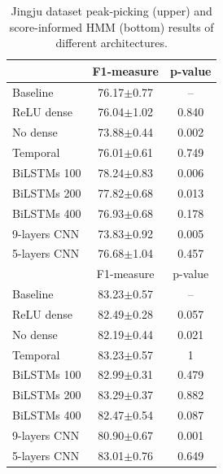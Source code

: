 \begin{table}[ht!]
\centering
\caption{Jingju dataset peak-picking (upper) and score-informed HMM (bottom) results of different architectures.}
\label{table:peak_picking_jingju_archi}
\begin{tabular}{l|cc}
\toprule
               & F1-measure & p-value \\
\midrule
Baseline     &76.17$\pm$0.77     & -- \\
ReLU dense     &76.04$\pm$1.02       & 0.840              \\
No dense       &73.88$\pm$0.44       & 0.002              \\
Temporal       &76.01$\pm$0.61       & 0.749              \\
BiLSTMs 100 &78.24$\pm$0.83       & 0.006              \\
BiLSTMs 200 &77.82$\pm$0.68       & 0.013              \\
BiLSTMs 400 &76.93$\pm$0.68       & 0.178              \\
9-layers \gls{CNN}   &73.83$\pm$0.92        & 0.005              \\
5-layers \gls{CNN}   &76.68$\pm$1.04         & 0.457             \\

\toprule
               & F1-measure & p-value \\
\midrule
Baseline     & 83.23$\pm$0.57     & --        \\  
ReLU dense     & 82.49$\pm$0.28        & 0.057              \\
No dense       & 82.19$\pm$0.44         & 0.021              \\
Temporal       & 83.23$\pm$0.57         & 1                  \\
BiLSTMs 100 & 82.99$\pm$0.31         & 0.479              \\
BiLSTMs 200 & 83.29$\pm$0.37         & 0.882              \\
BiLSTMs 400 & 82.47$\pm$0.54        & 0.087              \\
9-layers \gls{CNN}   & 80.90$\pm$0.67         & 0.001              \\
5-layers \gls{CNN}   & 83.01$\pm$0.76        & 0.649             \\
\bottomrule
\end{tabular}
\end{table}

